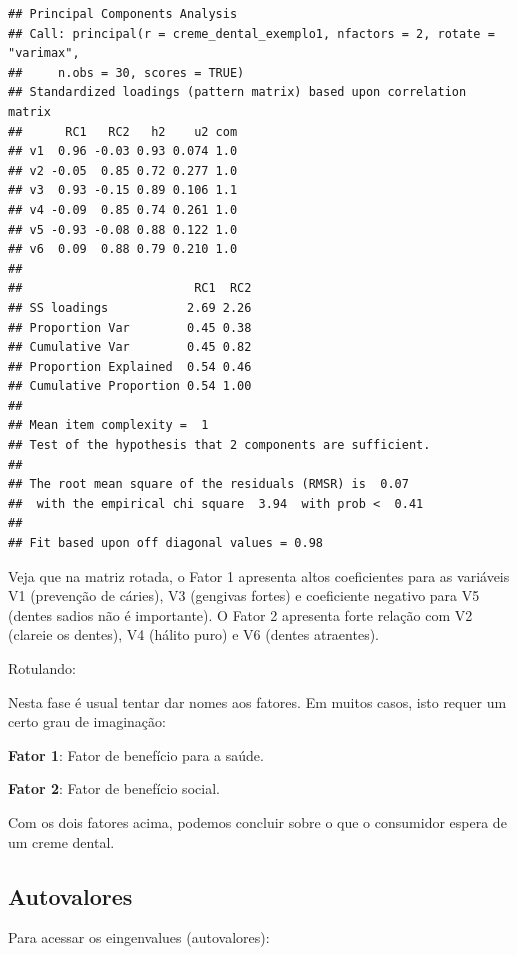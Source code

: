 \documentclass[12pt,brazil,]{book}
\newenvironment{Shaded}{\begin{snugshade}}{\end{snugshade}}
\newcommand{\NormalTok}[1]{#1}
\newcommand{\OperatorTok}[1]{\textcolor[rgb]{0.81,0.36,0.00}{\textbf{#1}}}
\begin{document}
\begin{verbatim}
## Principal Components Analysis
## Call: principal(r = creme_dental_exemplo1, nfactors = 2, rotate = "varimax", 
##     n.obs = 30, scores = TRUE)
## Standardized loadings (pattern matrix) based upon correlation matrix
##      RC1   RC2   h2    u2 com
## v1  0.96 -0.03 0.93 0.074 1.0
## v2 -0.05  0.85 0.72 0.277 1.0
## v3  0.93 -0.15 0.89 0.106 1.1
## v4 -0.09  0.85 0.74 0.261 1.0
## v5 -0.93 -0.08 0.88 0.122 1.0
## v6  0.09  0.88 0.79 0.210 1.0
## 
##                        RC1  RC2
## SS loadings           2.69 2.26
## Proportion Var        0.45 0.38
## Cumulative Var        0.45 0.82
## Proportion Explained  0.54 0.46
## Cumulative Proportion 0.54 1.00
## 
## Mean item complexity =  1
## Test of the hypothesis that 2 components are sufficient.
## 
## The root mean square of the residuals (RMSR) is  0.07 
##  with the empirical chi square  3.94  with prob <  0.41 
## 
## Fit based upon off diagonal values = 0.98
\end{verbatim}

Veja que na matriz rotada, o Fator 1 apresenta altos coeficientes para
as variáveis V1 (prevenção de cáries), V3 (gengivas fortes) e
coeficiente negativo para V5 (dentes sadios não é importante). O Fator 2
apresenta forte relação com V2 (clareie os dentes), V4 (hálito puro) e
V6 (dentes atraentes).

Rotulando:

Nesta fase é usual tentar dar nomes aos fatores. Em muitos casos, isto
requer um certo grau de imaginação:

\textbf{Fator 1}: Fator de benefício para a saúde.

\textbf{Fator 2}: Fator de benefício social.

Com os dois fatores acima, podemos concluir sobre o que o consumidor
espera de um creme dental.

\hypertarget{autovalores-1}{%
\subsection{Autovalores}\label{autovalores-1}}

Para acessar os eingenvalues (autovalores):

\begin{Shaded}
\end{Shaded}
\end{document}
